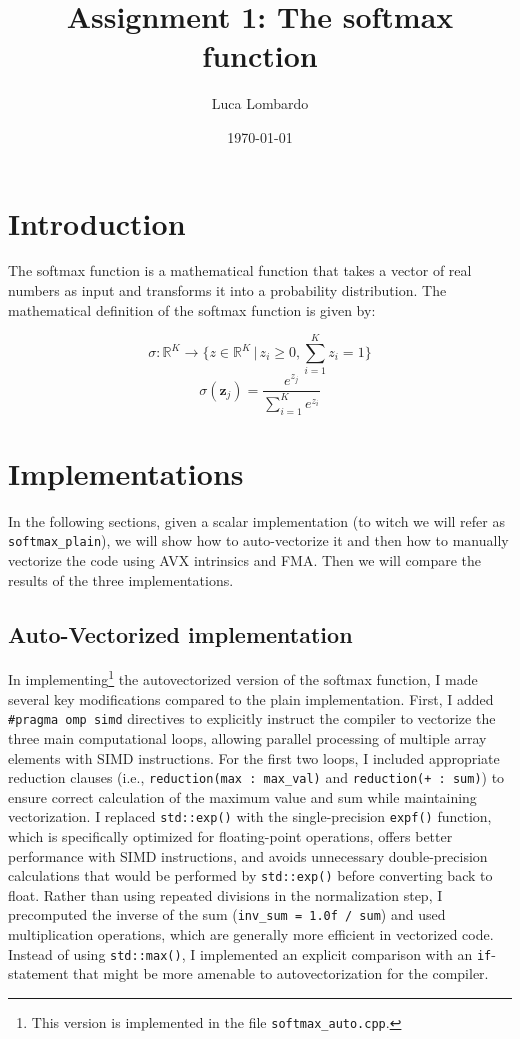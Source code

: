 \documentclass[11pt]{article}
\title{Assignment 1: The softmax function}
\author{Luca Lombardo}
\date{\today}
\newcommand{\R}{\mathbb{R}}
\begin{document}
\maketitle

\tableofcontents

\setlength{\parindent}{0em}

\section{Introduction}
The softmax function is a mathematical function that takes a vector of real numbers as input and transforms it into a probability distribution. The mathematical definition of the softmax function is given by:

\begin{equation*}
    \sigma: \R^K \to \Big\{ z \in \R^K \,|\, z_i \geq 0, \sum_{i=1}^K z_i = 1 \Big\}
\end{equation*}
\begin{equation}
    \sigma(\mathbf{z}_j) = \frac{e^{z_j}}{\sum_{i=1}^K e^{z_i}}
\end{equation}

\section{Implementations}
In the following sections, given a scalar implementation (to witch we will refer as \texttt{softmax\_plain}), we will show how to auto-vectorize it and then how to manually vectorize the code using AVX intrinsics and FMA. Then we will compare the results of the three implementations.

\subsection{Auto-Vectorized implementation}
In implementing\footnote{This version is implemented in the file \texttt{softmax\_auto.cpp}.} the autovectorized version of the softmax function, I made several key modifications compared to the plain implementation. First, I added \texttt{\#pragma omp simd} directives to explicitly instruct the compiler to vectorize the three main computational loops, allowing parallel processing of multiple array elements with SIMD instructions. For the first two loops, I included appropriate reduction clauses (i.e., \texttt{reduction(max : max\_val)} and \texttt{reduction(+ : sum)}) to ensure correct calculation of the maximum value and sum while maintaining vectorization. I replaced \texttt{std::exp()} with the single-precision \texttt{expf()} function, which is specifically optimized for floating-point operations, offers better performance with SIMD instructions, and avoids unnecessary double-precision calculations that would be performed by \texttt{std::exp()} before converting back to float. Rather than using repeated divisions in the normalization step, I precomputed the inverse of the sum (\texttt{inv\_sum = 1.0f / sum}) and used multiplication operations, which are generally more efficient in vectorized code. Instead of using \texttt{std::max()}, I implemented an explicit comparison with an \texttt{if}-statement that might be more amenable to autovectorization for the compiler.
\end{document}
